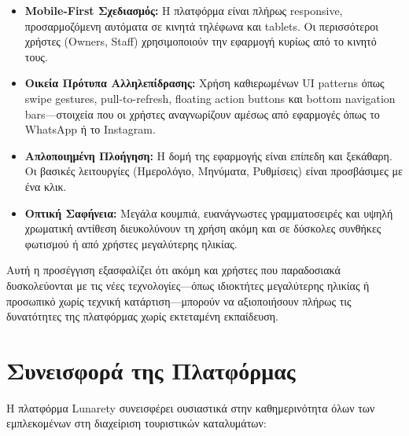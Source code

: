 \documentclass[
	12pt, %
	oneside, %
	greek,
	onehalfspacing, %
	liststotoc, %
	toctotoc, %
	parskip, %
	headsepline, %
]{MastersDoctoralThesis} %
\begin{document}
\begin{itemize}
    \item \textbf{Mobile-First Σχεδιασμός:} Η πλατφόρμα είναι πλήρως responsive, προσαρμοζόμενη αυτόματα σε κινητά τηλέφωνα και tablets. Οι περισσότεροι χρήστες (Owners, Staff) χρησιμοποιούν την εφαρμογή κυρίως από το κινητό τους.
    \item \textbf{Οικεία Πρότυπα Αλληλεπίδρασης:} Χρήση καθιερωμένων UI patterns όπως swipe gestures, pull-to-refresh, floating action buttons και bottom navigation bars---στοιχεία που οι χρήστες αναγνωρίζουν αμέσως από εφαρμογές όπως το WhatsApp ή το Instagram.
    \item \textbf{Απλοποιημένη Πλοήγηση:} Η δομή της εφαρμογής είναι επίπεδη και ξεκάθαρη. Οι βασικές λειτουργίες (Ημερολόγιο, Μηνύματα, Ρυθμίσεις) είναι προσβάσιμες με ένα κλικ.
    \item \textbf{Οπτική Σαφήνεια:} Μεγάλα κουμπιά, ευανάγνωστες γραμματοσειρές και υψηλή χρωματική αντίθεση διευκολύνουν τη χρήση ακόμη και σε δύσκολες συνθήκες φωτισμού ή από χρήστες μεγαλύτερης ηλικίας.
\end{itemize}

Αυτή η προσέγγιση εξασφαλίζει ότι ακόμη και χρήστες που παραδοσιακά δυσκολεύονται με τις νέες τεχνολογίες---όπως ιδιοκτήτες μεγαλύτερης ηλικίας ή προσωπικό χωρίς τεχνική κατάρτιση---μπορούν να αξιοποιήσουν πλήρως τις δυνατότητες της πλατφόρμας χωρίς εκτεταμένη εκπαίδευση.

\section{Συνεισφορά της Πλατφόρμας}
\label{sec:platform-contribution}

Η πλατφόρμα Lunarety συνεισφέρει ουσιαστικά στην καθημερινότητα όλων των εμπλεκομένων στη διαχείριση τουριστικών καταλυμάτων:
\end{document}
